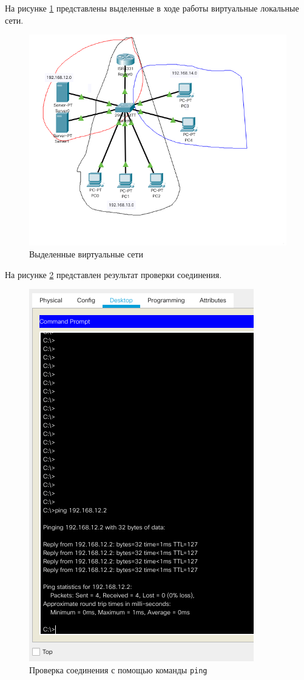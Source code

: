 \documentclass[12pt]{report}
\begin{document}
На рисунке \ref{fig:7} представлены выделенные в ходе работы виртуальные локальные сети.

\begin{figure}[H]
	\begin{center}
		\includegraphics[scale=0.7]{img/7.png}
	\end{center}
	\caption{Выделенные виртуальные сети}
	\label{fig:7}
\end{figure}

На рисунке \ref{fig:8} представлен результат проверки соединения.

\begin{figure}[H]
	\begin{center}
		\includegraphics[scale=0.8]{img/8.png}
	\end{center}
	\caption{Проверка соединения с помощью команды \texttt{ping}}
	\label{fig:8}
\end{figure}



	
\end{document}

